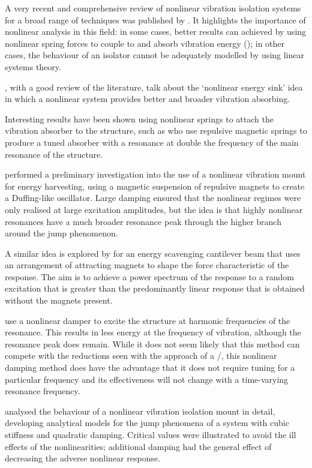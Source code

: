 A very recent and comprehensive review of nonlinear vibration isolation systems for a broad range of techniques was published by \textcite{ibrahim2008}.
It highlights the importance of nonlinear analysis in this field: in some cases, better results can achieved by using nonlinear spring forces to couple to and absorb vibration energy (); in other cases, the behaviour of an isolator cannot be adequately modelled by using linear systems theory.

\textcite{starosvetsky2008}, with a good review of the literature, talk about the `nonlinear energy sink' idea in which a nonlinear system provides better and broader vibration absorbing.

Interesting results have been shown using nonlinear springs to attach the vibration absorber to the structure, such as \textcite{jo2008} who use repulsive magnetic springs to produce a tuned absorber with a resonance at double the frequency of the main resonance of the structure.

\textcite{mann2008} performed a preliminary investigation into the use of a nonlinear vibration mount for energy harvesting, using a magnetic suspension of repulsive magnets to create a Duffing-like oscillator.
Large damping ensured that the nonlinear regimes were only realised at large excitation amplitudes, but the idea is that highly nonlinear resonances have a much broader resonance peak through the higher branch around the jump phenomenon.

A similar idea is explored by \textcite{shahruz2008} for an energy scavenging cantilever beam that uses an arrangement of attracting magnets to shape the force characteristic of the response.
The aim is to achieve a power spectrum of the response to a random excitation that is greater than the predominantly linear response that is obtained without the magnets present.

\textcite{zhang2008} use a nonlinear damper to excite the structure at harmonic frequencies of the resonance.
This results in less energy at the frequency of vibration, although the resonance peak does remain.
While it does not seem likely that this method can compete with the reductions seen with the approach of a \vibneut/, this nonlinear damping method does have the advantage that it does not require tuning for a particular frequency and its effectiveness will not change with a time-varying resonance frequency.

\textcite{jazar2006} analysed the behaviour of a nonlinear vibration isolation mount in detail, developing analytical models for the jump phenomena of a system with cubic stiffness and quadratic damping.
Critical values were illustrated to avoid the ill effects of the nonlinearities; additional damping had the general effect of decreasing the adverse nonlinear response.

